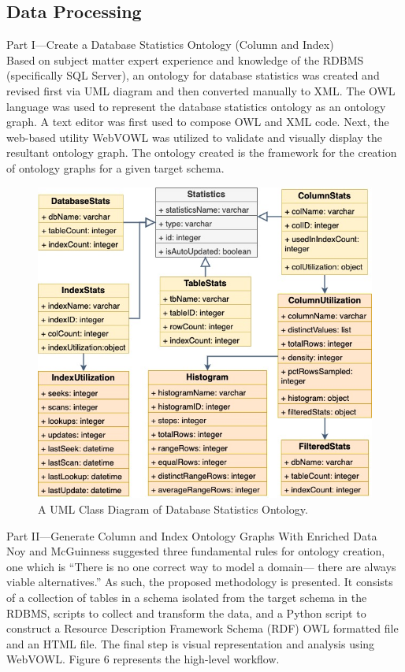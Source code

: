 \documentclass[sigconf]{acmart}
\begin{document}
\subsection{Data Processing}

Part I—Create a Database Statistics Ontology (Column and Index)\\
Based on subject matter expert experience and knowledge of the RDBMS (specifically
SQL Server), an ontology for database statistics was created and revised first via UML diagram
and then converted manually to XML. The OWL language was used to represent the database
statistics ontology as an ontology graph. A text editor was first used to compose OWL and XML
code. Next, the web-based utility WebVOWL was utilized to validate and visually display the
resultant ontology graph. The ontology created is the framework for the creation of ontology
graphs for a given target schema. 

\begin{figure}[h]
	\centering
	\includegraphics[width=\linewidth]{uml-db-statistic}
	\caption{A UML Class Diagram of Database Statistics Ontology.}
	\label{statistics-class-diagram}
\end{figure}

Part II—Generate Column and Index Ontology Graphs With Enriched Data\\
Noy and McGuinness \cite{noy2001ontology} suggested three fundamental rules for ontology creation,
one which is “There is no one correct way to model a domain— there are always viable
alternatives.” As such, the proposed methodology is presented. It consists of a collection of
tables in a schema isolated from the target schema in the RDBMS, scripts to collect and
transform the data, and a Python script to construct a Resource Description Framework Schema
(RDF) OWL formatted file and an HTML file. The final step is visual representation and analysis
using WebVOWL. Figure 6 represents the high-level workflow.
\end{document}
